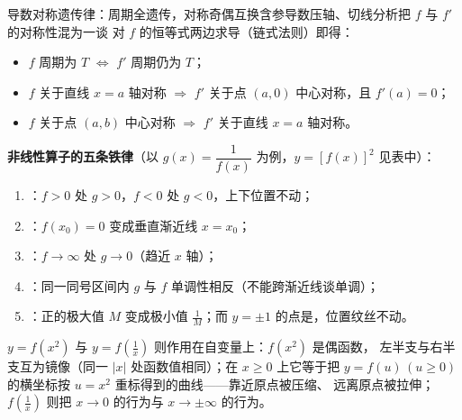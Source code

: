 \begin{explore}
\begin{center}
\end{center}

\begin{conccard}[二级]{导数对称遗传律：周期全遗传，对称奇偶互换}{含参导数压轴、切线分析}{把 $f$ 与 $f'$ 的对称性混为一谈}
对 $f$ 的恒等式两边求导（链式法则）即得：
\begin{itemize}
\item $f$ 周期为 $T$ $\iff$ $f'$ 周期仍为 $T$；
\item $f$ 关于直线 $x=a$ 轴对称 $\Rightarrow$ $f'$ 关于点 $(a,0)$ 中心对称，且 $f'(a)=0$；
\item $f$ 关于点 $(a,b)$ 中心对称 $\Rightarrow$ $f'$ 关于直线 $x=a$ 轴对称。
\end{itemize}
\end{conccard}

\begin{method}
\textbf{非线性算子的五条铁律}（以 $g(x)=\dfrac1{f(x)}$ 为例，$y=[f(x)]^2$ 见表中）：
\begin{enumerate}
\item {}：$f>0$ 处 $g>0$，$f<0$ 处 $g<0$，上下位置不动；
\item {}：$f(x_0)=0$ 变成垂直渐近线 $x=x_0$；
\item {}：$f\to\infty$ 处 $g\to0$（趋近 $x$ 轴）；
\item {}：同一同号区间内 $g$ 与 $f$ 单调性相反（不能跨渐近线谈单调）；
\item {}：正的极大值 $M$ 变成极小值 $\frac1M$；而 $y=\pm1$ 的点是，位置纹丝不动。
\end{enumerate}
$y=f(x^2)$ 与 $y=f\!\left(\frac1x\right)$ 则作用在自变量上：$f(x^2)$ 是偶函数，
左半支与右半支互为镜像（同一 $|x|$ 处函数值相同）；在 $x\ge0$ 上它等于把
$y=f(u)\,(u\ge0)$ 的横坐标按 $u=x^2$ 重标得到的曲线——靠近原点被压缩、
远离原点被拉伸；$f\!\left(\frac1x\right)$ 则把 $x\to0$ 的行为与
$x\to\pm\infty$ 的行为。


\end{method}
\end{explore}
